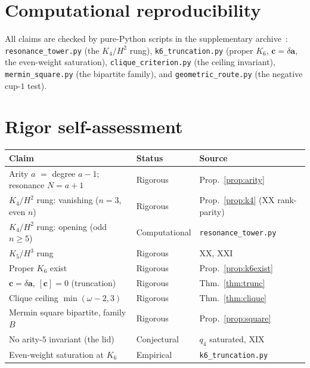 \documentclass[11pt,a4paper]{article}
\theoremstyle{plain}
\theoremstyle{definition}
\theoremstyle{remark}
\begin{document}
\section*{Computational reproducibility}

All claims are checked by pure-Python scripts in the supplementary
archive~\cite{PaperXXIIsuppl}: \texttt{resonance\_tower.py} (the $K_4/H^2$ rung),
\texttt{k6\_truncation.py} (proper $K_6$, $\mathbf c=\delta\mathbf a$, the
even-weight saturation), \texttt{clique\_criterion.py} (the ceiling invariant),
\texttt{mermin\_square.py} (the bipartite family), and
\texttt{geometric\_route.py} (the negative cup-$1$ test).

\section*{Rigor self-assessment}

\begin{center}
\renewcommand{\arraystretch}{1.1}
\begin{tabular}{p{6.6cm}ll}
\toprule
Claim & Status & Source \\
\midrule
Arity $a$ $=$ degree $a-1$; resonance $N=a+1$ & Rigorous & Prop.~\ref{prop:arity} \\
$K_4/H^2$ rung: vanishing ($n=3$, even $n$) & Rigorous & Prop.~\ref{prop:k4} (XX rank-parity) \\
$K_4/H^2$ rung: opening (odd $n\ge5$) & Computational & \texttt{resonance\_tower.py} \\
$K_5/H^3$ rung & Rigorous & XX, XXI \\
Proper $K_6$ exist & Rigorous & Prop.~\ref{prop:k6exist} \\
$\mathbf c=\delta\mathbf a$, $[\mathbf c]=0$ (truncation) & Rigorous & Thm.~\ref{thm:trunc} \\
Clique ceiling $\min(\omega-2,3)$ & Rigorous & Thm.~\ref{thm:clique} \\
Mermin square bipartite, family $B$ & Rigorous & Prop.~\ref{prop:square} \\
No arity-$5$ invariant (the lid) & Conjectural & $q_4$ saturated, XIX \\
Even-weight saturation at $K_6$ & Empirical & \texttt{k6\_truncation.py} \\
\bottomrule
\end{tabular}
\end{center}
\end{document}
